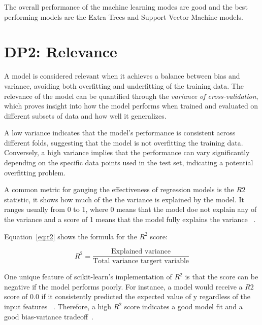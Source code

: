 The overall performance of the machine learning modes are good and the best performing models are the Extra Trees and
Support Vector Machine models.


\section{DP2: Relevance}\label{sec:relevance}

A model is considered relevant when it achieves a balance between bias and
variance, avoiding both overfitting and underfitting of the training data.
The relevance of the model can be quantified through the \textit{variance of cross-validation}, which proves insight
into how the model performs when trained and
evaluated on different subsets of data and how well it generalizes.

A low variance indicates that the model's performance is consistent across
different folds, suggesting that the model is not overfitting the training data.
Conversely, a high variance implies that the performance can vary significantly
depending on the specific data points used in the test set, indicating a potential
overfitting problem.

A common metric for gauging the effectiveness of regression models is the $R2$ statistic, it shows how much of the
the variance is explained by the model.
It ranges usually from 0 to 1, where 0 means that the model doe not explain any of the variance and a score of 1
means that the model fully explains the variance
~\cite[p. 43]{muller_introductionmachinelearning_2016}.

Equation~\eqref{eq:r2} shows the formula for the $R^2$ score:

\begin{equation}
    \label{eq:r2}
    R^2 = \frac{\text{Explained variance}}{\text{Total variance targert variable}}
\end{equation}

One unique feature of scikit-learn's implementation of $R^2$ is that the score can be negative if the model performs
poorly.
For instance, a model would receive a $R2$ score of 0.0 if it consistently predicted the expected value of y
regardless of the input features
~\cite{_sklearnmetricsr2_}.
Therefore, a high $R^2$ score indicates a good model fit and a good bias-variance
tradeoff~\cite[p. 43]{muller_introductionmachinelearning_2016}.

